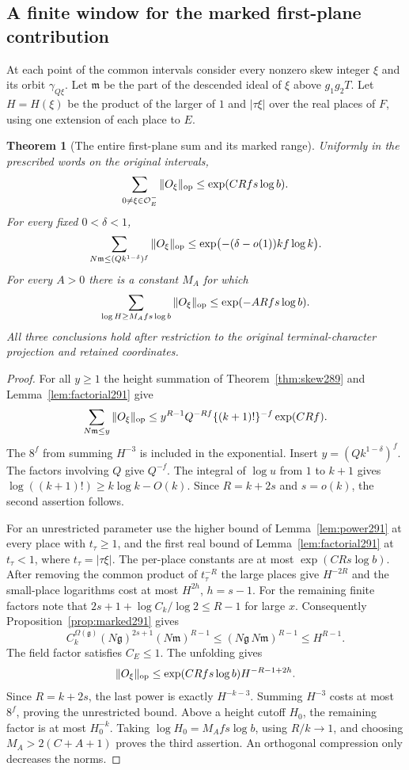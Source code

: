 \documentclass[a4paper,11pt]{article}
\newtheorem{theorem}[proposition]{Theorem}
\theoremstyle{definition}
\theoremstyle{remark}
\numberwithin{equation}{section}
\begin{document}
\subsection{A finite window for the marked first-plane contribution}\label{nav:IX-54}
At each point of the common intervals consider every nonzero
skew integer \(\xi\) and its orbit \(\gamma_{Q\xi}\).
Let \(\mathfrak m\) be the part of the descended ideal of
\(\xi\) above \(g_1g_2T\). Let \(H=H(\xi)\) be the product
of the larger of \(1\) and \(|\tau\xi|\) over the real
places of \(F\), using one extension of each place to \(E\).

\begin{theorem}[The entire first-plane sum and its marked range]\leavevmode
\label{thm:window291}
Uniformly in the prescribed words on the original intervals,
\[
 \sum_{0\ne\xi\in\mathcal O_E^-}\|O_\xi\|_{\rm op}
                      \le\exp(C R f s\log b).
\]
For every fixed \(0<\delta<1\),
\[
 \sum_{N\mathfrak m\le (Q k^{1-\delta})^f}\|O_\xi\|_{\rm op}
                 \le\exp\bigl(-(\delta-o(1))k f\log k\bigr).
\]
For every \(A>0\) there is a constant \(M_A\) for which
\[
  \sum_{\log H\ge M_A f s\log b}\|O_\xi\|_{\rm op}
                         \le \exp(-A R f s\log b).
\]
All three conclusions hold after restriction to the original
terminal-character projection and retained coordinates.
\end{theorem}
\begin{proof}
For all \(y\ge1\) the height summation of
Theorem~\ref{thm:skew289} and Lemma~\ref{lem:factorial291}
give
\[
 \sum_{N\mathfrak m\le y}\|O_\xi\|_{\rm op}
       \le y^{R-1}Q^{-Rf}\{(k+1)!\}^{-f}\exp(C R f).
\]
The \(8^f\) from summing \(H^{-3}\) is included in the
exponential. Insert \(y=(Q k^{1-\delta})^f\).
The factors involving \(Q\) give \(Q^{-f}\).
The integral of \(\log u\) from \(1\) to \(k+1\) gives
\(\log((k+1)!)\ge k\log k-O(k)\). Since \(R=k+2s\)
and \(s=o(k)\), the second assertion follows.

For an unrestricted parameter use the higher bound of
Lemma~\ref{lem:power291} at every place with \(t_\tau\ge1\),
and the first real bound of Lemma~\ref{lem:factorial291}
at \(t_\tau<1\), where \(t_\tau=|\tau\xi|\).
The per-place constants are at most \(\exp(C R s\log b)\).
After removing the common product of \(t_\tau^{-R}\)
the large places give \(H^{-2R}\) and the small-place
logarithms cost at most \(H^{2h}\), \(h=s-1\).
For the remaining finite factors note that
\(2s+1+\log C_k/\log 2\le R-1\) for large \(x\).
Consequently Proposition~\ref{prop:marked291} gives
\[
   C_k^{\Omega(\mathfrak g)}
    (N\mathfrak g)^{2s+1}(N\mathfrak m)^{R-1}
       \le (N\mathfrak g\,N\mathfrak m)^{R-1}\le H^{R-1}.
\]
The field factor satisfies \(C_E\le1\). The unfolding gives
\[
     \|O_\xi\|_{\rm op}\le\exp(C R f s\log b)H^{-R-1+2h}.
\]
Since \(R=k+2s\), the last power is exactly \(H^{-k-3}\).
Summing \(H^{-3}\) costs at most \(8^f\), proving the
unrestricted bound. Above a height cutoff \(H_0\), the
remaining factor is at most \(H_0^{-k}\). Taking
\(\log H_0=M_A f s\log b\), using \(R/k\to1\), and
choosing \(M_A>2(C+A+1)\) proves the third assertion.
An orthogonal compression only decreases the norms.
\end{proof}
\end{document}
